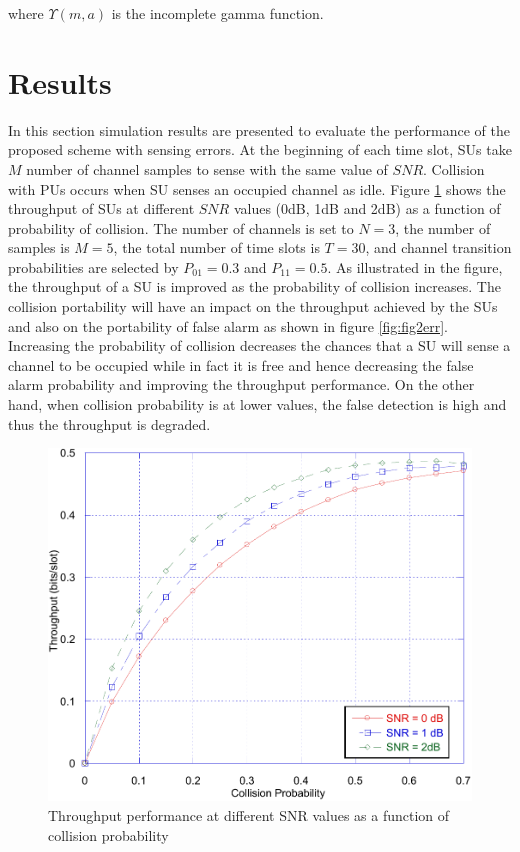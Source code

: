 \documentclass[twocolumn]{el-author}
\begin{document}
where $\Upsilon (m,a)$ is the incomplete gamma function.
%	
\section{Results}
In this section simulation results are presented to evaluate the performance of the proposed scheme with sensing errors. At the beginning of each time slot, SUs take $M$ number of channel samples to sense with the same value of $SNR$. Collision with PUs occurs when SU senses an occupied channel as idle.
Figure \ref{fig:fig1err} shows the throughput of SUs at different $SNR$ values (0dB, 1dB and 2dB) as a function of probability of collision. The number of channels is set to $N=3$, the number of samples is $M=5$, the total number of time slots is $T= 30$, and channel transition probabilities are selected by $ P_ {01} = 0.3 $ and $P_{11}=0.5$. As illustrated in the figure, the throughput of a SU is improved as the probability of collision increases. The collision portability  will have an impact on the throughput achieved by the SUs and also on the portability of false alarm as shown in figure \ref{fig:fig2err}. Increasing the probability of collision decreases the chances that a SU will sense a channel to be occupied while in fact it is free and hence decreasing the false alarm probability and improving the throughput performance. On the other hand, when collision probability is at lower values, the false detection is high and thus the throughput is degraded.
\begin{figure}
\centering
\includegraphics[width=0.7\linewidth]{./fig1_err}
\caption{Throughput performance at different SNR values as a function of collision probability}
\label{fig:fig1err}
\end{figure}
\end{document}
